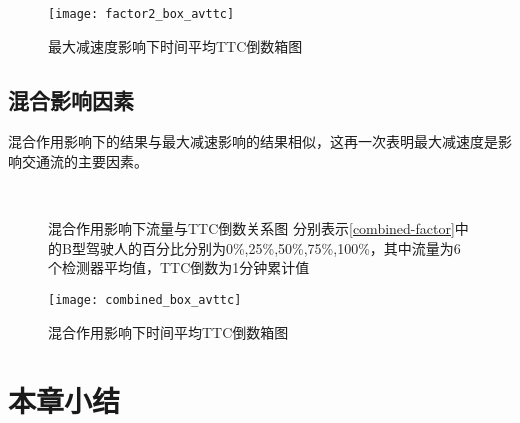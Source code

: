 \begin{figure}[!htb]
\begin{center}
\texttt{[image: factor2\_box\_avttc]}
\caption{最大减速度影响下时间平均TTC倒数箱图}
\label{factor2_box_avttc}
\end{center}
\end{figure}

\subsection{混合影响因素}

混合作用影响下的结果与最大减速影响的结果相似，这再一次表明最大减速度是影响交通流的主要因素。
\begin{figure}[!htb]%
\centering
{}%
\\%
%
\caption[A set of four sub-floats.]{混合作用影响下流量与TTC倒数关系图
分别表示\autoref{combined-factor}中的B型驾驶人的百分比分别为0\%,25\%,50\%,75\%,100\%，其中流量为6个检测器平均值，TTC倒数为1分钟累计值}%
\label{combined_ttc}%
\end{figure}

\begin{figure}[!htb]
\begin{center}
\texttt{[image: combined\_box\_avttc]}
\caption{混合作用影响下时间平均TTC倒数箱图}
\label{combined_box_avttc}
\end{center}
\end{figure}

\section{本章小结}



%
%
%



